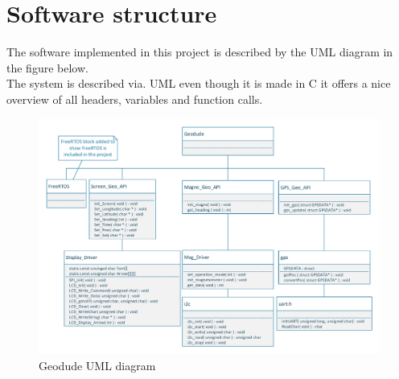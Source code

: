 \section{Software structure}
The software implemented in this project is described by the UML diagram in the figure below.\\
The system is described via. UML even though it is made in C it offers a nice overview of all headers, variables and function calls.\\

\begin{figure}[H]
\centering
\includegraphics[width=1\textwidth]{billeder/geodude_UML}
\caption{Geodude UML diagram}
\end{figure}

